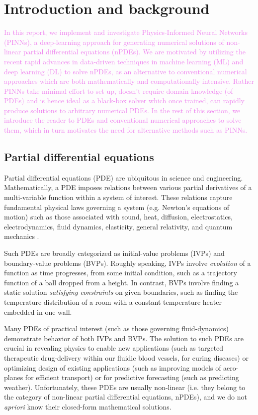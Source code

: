 \documentclass[11pt]{article}
\newcommand{\newcontent}[1]{\textcolor{violet}{#1}}
\begin{document}
\newpage

\section{Introduction and background}
\label{sec:orgfff21aa}
\newcontent{
In this report, we implement and investigate Physics-Informed Neural Networks
(PINNs), a deep-learning approach for generating numerical solutions
of non-linear partial differential equations (nPDEs). We are motivated by utilizing
the recent rapid advances in data-driven techniques in machine learning (ML)
and deep learning (DL) to solve nPDEs, as an alternative to conventional
numerical approaches which are both mathematically and computationally
intensive. Rather PINNs take minimal effort to set up, doesn't require domain
knowledge (of PDEs) and is hence ideal as a black-box solver which once trained,
can rapidly produce solutions to arbitrary numerical PDEs. In the rest of this
section, we introduce the reader to PDEs and conventional numerical approaches to
solve them, which in turn motivates the need for alternative methods such as PINNs.
 }

\subsection{Partial differential equations}
\label{sec:orgccb257c}
Partial differential equations (PDE) are ubiquitous in science and
engineering. Mathematically, a PDE imposes relations between various partial
derivatives of a multi-variable function within a system of interest. These
relations capture fundamental physical laws governing a system (e.g.
Newton's equations of motion) such as those associated with sound, heat,
diffusion, electrostatics, electrodynamics, fluid dynamics, elasticity,
general relativity, and quantum mechanics \cite{wiki:pde}.

Such PDEs are broadly categorized as initial-value problems (IVPs) and boundary-value problems
(BVPs). Roughly speaking, IVPs involve \emph{evolution} of a function as time
progresses, from some initial condition, such as a trajectory function of a ball
dropped from a height. In contrast, BVPs involve finding a static solution \emph{satisfying
constraints} on given boundaries, such as finding the temperature distribution
of a room with a constant temperature heater embedded in one wall.

Many PDEs of practical interest (such as those governing fluid-dynamics)
demonstrate behavior of both IVPs and BVPs. The solution to such PDEs are
crucial in revealing physics to enable new applications (such as
targeted therapeutic drug-delivery within our fluidic blood vessels, for
curing diseases) or optimizing design of existing applications (such as
improving models of aero-planes for efficient transport) or for predictive
forecasting (such as predicting weather). Unfortunately, these PDEs are
usually non-linear (i.e. they belong to the category of non-linear partial differential equations, nPDEs),
and we do not \emph{apriori} know their closed-form mathematical solutions.
\end{document}
